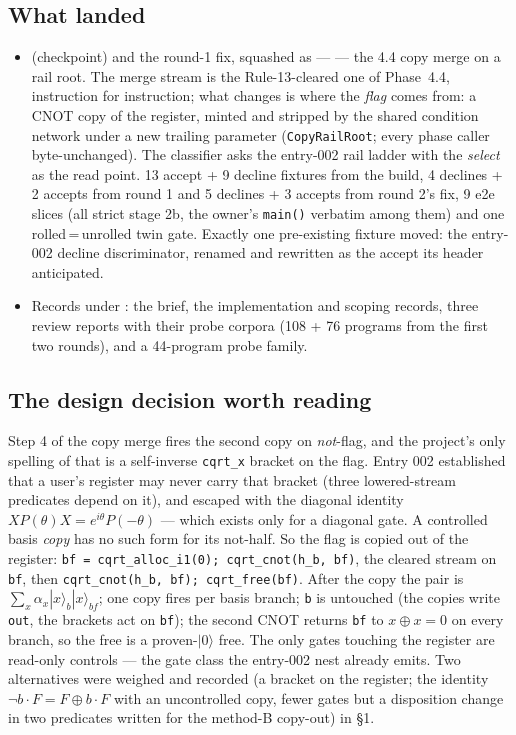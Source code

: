 \subsection*{What landed}
\begin{itemize}
  \item {} (checkpoint) and the round-1 fix, squashed as  --- 
    --- the 4.4 copy merge on a rail root. The merge stream is the Rule-13-cleared one of
    Phase~4.4, instruction for instruction; what changes is where the \emph{flag} comes from: a
    CNOT copy of the register, minted and stripped by the shared condition network under a new
    trailing parameter (\texttt{CopyRailRoot}; every phase caller byte-unchanged). The classifier
    asks the entry-002 rail ladder with the \emph{select} as the read point. 13 accept + 9 decline
    fixtures from the build, 4 declines + 2 accepts from round 1 and 5 declines + 3 accepts from round 2's fix, 9 e2e slices (all strict
    stage 2b, the owner's \texttt{main()} verbatim among them) and one rolled\,=\,unrolled twin gate.
    Exactly one pre-existing fixture moved: the entry-002 decline discriminator, renamed and
    rewritten as the accept its header anticipated.
  \item Records under : the brief, the implementation and
    scoping records, three review reports with their probe corpora (108 + 76 programs from the first two rounds), and a 44-program probe family.
\end{itemize}

\subsection*{The design decision worth reading}
Step 4 of the copy merge fires the second copy on \emph{not}-flag, and the project's only spelling
of that is a self-inverse \texttt{cqrt\_x} bracket on the flag. Entry 002 established that a user's
register may never carry that bracket (three lowered-stream predicates depend on it), and escaped
with the diagonal identity \(X P(\theta) X = e^{i\theta} P(-\theta)\) --- which exists only for a
diagonal gate. A controlled basis \emph{copy} has no such form for its not-half. So the flag is
copied out of the register: \texttt{bf = cqrt\_alloc\_i1(0); cqrt\_cnot(h\_b, bf)}, the cleared
stream on \texttt{bf}, then \texttt{cqrt\_cnot(h\_b, bf); cqrt\_free(bf)}. After the copy the pair is
\(\sum_x \alpha_x |x\rangle_b |x\rangle_{bf}\); one copy fires per basis branch; \texttt{b} is untouched
(the copies write \texttt{out}, the brackets act on \texttt{bf}); the second CNOT returns \texttt{bf}
to \(x \oplus x = 0\) on every branch, so the free is a proven-\(|0\rangle\) free. The only gates
touching the register are read-only controls --- the gate class the entry-002 nest already emits.
Two alternatives were weighed and recorded (a bracket on the register; the identity
\(\neg b\cdot F = F \oplus b\cdot F\) with an uncontrolled copy, fewer gates but a disposition change
in two predicates written for the method-B copy-out) in  \S1.

